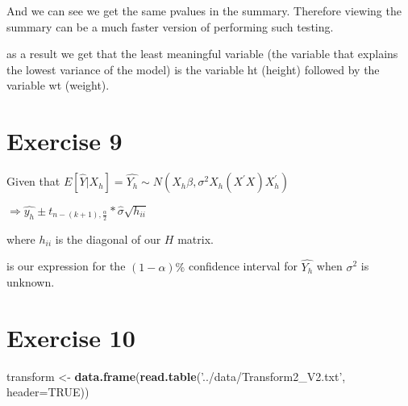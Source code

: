 \documentclass[]{article}
\newenvironment{Shaded}{\begin{snugshade}}{\end{snugshade}}
\newcommand{\DataTypeTok}[1]{\textcolor[rgb]{0.13,0.29,0.53}{#1}}
\newcommand{\KeywordTok}[1]{\textcolor[rgb]{0.13,0.29,0.53}{\textbf{#1}}}
\newcommand{\NormalTok}[1]{#1}
\newcommand{\OtherTok}[1]{\textcolor[rgb]{0.56,0.35,0.01}{#1}}
\newcommand{\StringTok}[1]{\textcolor[rgb]{0.31,0.60,0.02}{#1}}
\begin{document}
And we can see we get the same pvalues in the summary. Therefore viewing
the summary can be a much faster version of performing such testing.

as a result we get that the least meaningful variable (the variable that
explains the lowest variance of the model) is the variable ht (height)
followed by the variable wt (weight).

\newpage

\hypertarget{exercise-9}{%
\section{Exercise 9}\label{exercise-9}}

Given that
\(E[\hat{Y} | X_{h}] = \hat{Y_{h}} \sim N(X_{h} \beta, \sigma^{2} X_{h} (X^{\prime} X) X_{h}^{\prime})\)

\(\Rightarrow \hat{y_{h}} \pm t_{n - (k+1), \frac{\alpha}{2}} * \hat{\sigma} \sqrt{h_{ii}}\)

where \(h_{ii}\) is the diagonal of our \(H\) matrix.

is our expression for the \((1-\alpha)\%\) confidence interval for
\(\hat{Y_{h}}\) when \(\sigma^{2}\) is unknown.

\hypertarget{exercise-10}{%
\section{Exercise 10}\label{exercise-10}}

\begin{Shaded}
\begin{Highlighting}[]
\NormalTok{transform <-}\StringTok{ }\KeywordTok{data.frame}\NormalTok{(}\KeywordTok{read.table}\NormalTok{(}\StringTok{'../data/Transform2_V2.txt'}\NormalTok{, }\DataTypeTok{header=}\OtherTok{TRUE}\NormalTok{))}
\end{Highlighting}
\end{Shaded}
\end{document}
